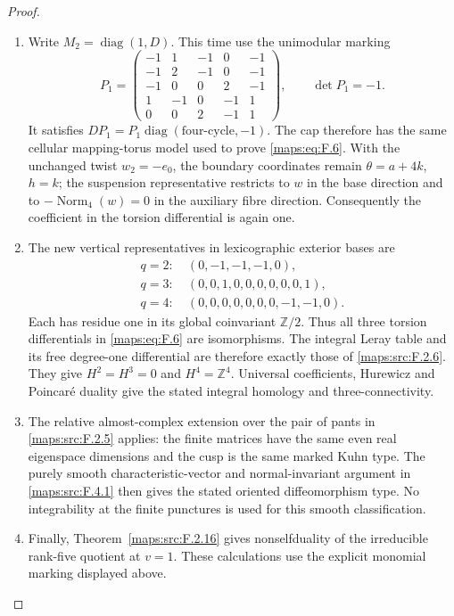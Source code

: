 \begin{proof}
\begin{enumerate}[label={$\langle1\rangle$\arabic*.}]
\item Write $M_2=\operatorname{diag}(1,D)$.  This time use the
unimodular marking
\[
 P_1=\begin{pmatrix}
 -1&1&-1&0&-1\\
 -1&2&-1&0&-1\\
 -1&0&0&2&-1\\
 1&-1&0&-1&1\\
 0&0&2&-1&1
 \end{pmatrix},\qquad \det P_1=-1.
\]
It satisfies $DP_1=P_1\operatorname{diag}(\text{four-cycle},-1)$.
The cap therefore has the same cellular mapping-torus model
used to prove \eqref{maps:eq:F.6}.  With the unchanged twist $w_2=-e_0$,
the boundary coordinates remain $\theta=a+4k$, $h=k$;
the suspension representative restricts to $w$ in the base
direction and to $-\operatorname{Norm}_4(w)=0$ in the
auxiliary fibre direction.  Consequently the coefficient in
the torsion differential is again one.

\item The new vertical representatives in lexicographic exterior
bases are
\[
\begin{split}
 q=2:\ &(0,-1,-1,-1,0),\\
 q=3:\ &(0,0,1,0,0,0,0,0,0,1),\\
 q=4:\ &(0,0,0,0,0,0,0,-1,-1,0).
\end{split}
\]
Each has residue one in its global coinvariant
$\mathbb Z/2$.  Thus all three torsion differentials in \eqref{maps:eq:F.6}
are isomorphisms.  The integral Leray table and its free
degree-one differential are therefore exactly those of
\ref{maps:src:F.2.6}.  They give $H^2=H^3=0$ and $H^4=\mathbb Z^4$.
Universal coefficients, Hurewicz and Poincar\'e duality give
the stated integral homology and three-connectivity.

\item The relative almost-complex extension over the pair of pants
in \ref{maps:src:F.2.5} applies: the finite matrices have the same even
real eigenspace dimensions and the cusp is the same marked
Kuhn type.  The purely smooth characteristic-vector and
normal-invariant argument in \ref{maps:src:F.4.1} then gives the stated
oriented diffeomorphism type.  No integrability at the finite
punctures is used for this smooth classification.

\item Finally, Theorem~\ref{maps:src:F.2.16} gives nonselfduality of the irreducible rank-five quotient at $v=1$.
These calculations use the explicit monomial marking displayed above.

\end{enumerate}
\end{proof}




